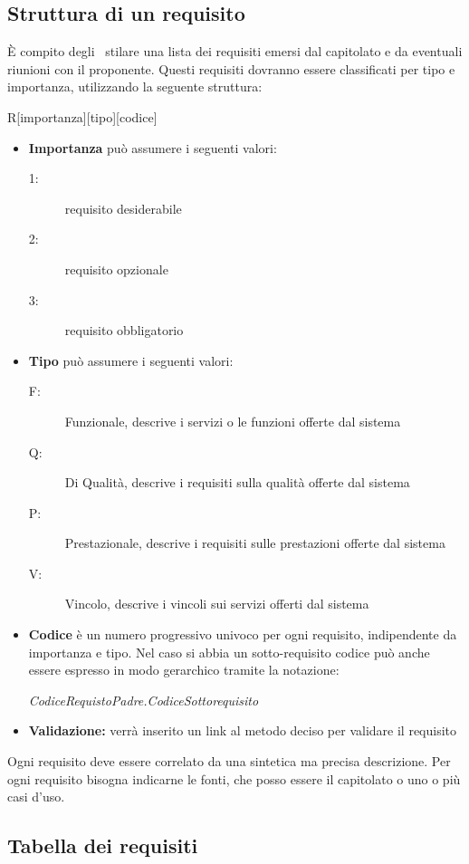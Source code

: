 \documentclass[12pt,a4paper]{article}
\begin{document}
\subsection{Struttura di un requisito}
È compito degli \ANpl\ stilare una lista dei requisiti emersi dal capitolato e da eventuali riunioni con il proponente. Questi requisiti dovranno essere classificati per tipo e importanza, utilizzando la seguente struttura:
\begin{center}
	R[importanza][tipo][codice]
\end{center}
\begin{itemize}
	\item \textbf{Importanza} può assumere i seguenti valori:
	\begin{description}
		\item[1:] requisito desiderabile
		\item[2:] requisito opzionale
		\item[3:] requisito obbligatorio
	\end{description}
	\item \textbf{Tipo} può assumere i seguenti valori:
	\begin{description}
		\item[F:] Funzionale, descrive i servizi o le funzioni offerte dal sistema
		\item[Q:] Di Qualità, descrive i requisiti sulla qualità offerte dal sistema
		\item[P:] Prestazionale, descrive i requisiti sulle prestazioni offerte dal sistema
		\item[V:] Vincolo, descrive i vincoli sui servizi offerti dal sistema
	\end{description}
	\item \textbf{Codice} è un numero progressivo univoco per ogni requisito, indipendente da importanza e tipo. Nel caso si abbia un sotto-requisito codice può anche essere espresso in modo gerarchico tramite la notazione:
	\begin{center}
		\textit{CodiceRequistoPadre.CodiceSottorequisito}
	\end{center}
	\item \textbf{Validazione:} verrà inserito un link al metodo deciso per validare il requisito
\end{itemize}
Ogni requisito deve essere correlato da una sintetica ma precisa descrizione. Per ogni requisito bisogna indicarne le fonti, che posso essere il capitolato o uno o più casi d'uso.

\subsection{Tabella dei requisiti}
\end{document}
